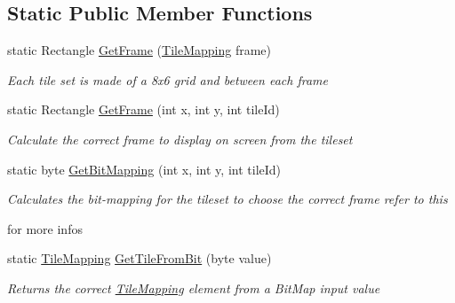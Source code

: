 \subsection*{Static Public Member Functions}
\begin{DoxyCompactItemize}
\item 
static Rectangle \mbox{\hyperlink{class_super_mario_1_1_level_components_1_1_block_afe826a9b23099b58f623e19b0422a3c0}{Get\+Frame}} (\mbox{\hyperlink{namespace_super_mario_1_1_level_components_a6fb13645a44790821090630fdf2b1afd}{Tile\+Mapping}} frame)
\begin{DoxyCompactList}\small\item\em Each tile set is made of a 8x6 grid and between each frame \end{DoxyCompactList}\item 
static Rectangle \mbox{\hyperlink{class_super_mario_1_1_level_components_1_1_block_a507402c0bd93c4659b28144580460ab9}{Get\+Frame}} (int x, int y, int tile\+Id)
\begin{DoxyCompactList}\small\item\em Calculate the correct frame to display on screen from the tileset \end{DoxyCompactList}\item 
static byte \mbox{\hyperlink{class_super_mario_1_1_level_components_1_1_block_a127645fecf73dad73e2e94d8e31ee11c}{Get\+Bit\+Mapping}} (int x, int y, int tile\+Id)
\begin{DoxyCompactList}\small\item\em Calculates the bit-\/mapping for the tileset to choose the correct frame refer to this

for more infos \end{DoxyCompactList}\item 
static \mbox{\hyperlink{namespace_super_mario_1_1_level_components_a6fb13645a44790821090630fdf2b1afd}{Tile\+Mapping}} \mbox{\hyperlink{class_super_mario_1_1_level_components_1_1_block_a58d5fb03dafc9daf7462446e16f666d7}{Get\+Tile\+From\+Bit}} (byte value)
\begin{DoxyCompactList}\small\item\em Returns the correct \mbox{\hyperlink{namespace_super_mario_1_1_level_components_a6fb13645a44790821090630fdf2b1afd}{Tile\+Mapping}} element from a Bit\+Map input value \end{DoxyCompactList}\end{DoxyCompactItemize}
